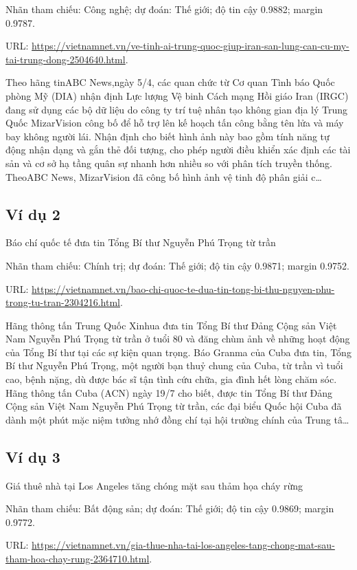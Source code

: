 \noindent Nhãn tham chiếu: Công nghệ; dự đoán: Thế giới; độ tin cậy 0.9882; margin 0.9787.

\noindent URL: \url{https://vietnamnet.vn/ve-tinh-ai-trung-quoc-giup-iran-san-lung-can-cu-my-tai-trung-dong-2504640.html}.

Theo hãng tinABC News,ngày 5/4, các quan chức từ Cơ quan Tình báo Quốc phòng Mỹ (DIA) nhận định Lực lượng Vệ binh Cách mạng Hồi giáo Iran (IRGC) đang sử dụng các bộ dữ liệu do công ty trí tuệ nhân tạo không gian địa lý Trung Quốc MizarVision công bố để hỗ trợ lên kế hoạch tấn công bằng tên lửa và máy bay không người lái. Nhận định cho biết hình ảnh này bao gồm tính năng tự động nhận dạng và gắn thẻ đối tượng, cho phép người điều khiển xác định các tài sản và cơ sở hạ tầng quân sự nhanh hơn nhiều so với phân tích truyền thống. TheoABC News, MizarVision đã công bố hình ảnh vệ tinh độ phân giải c\ldots

\subsection{Ví dụ 2}
Báo chí quốc tế đưa tin Tổng Bí thư Nguyễn Phú Trọng từ trần

\noindent Nhãn tham chiếu: Chính trị; dự đoán: Thế giới; độ tin cậy 0.9871; margin 0.9752.

\noindent URL: \url{https://vietnamnet.vn/bao-chi-quoc-te-dua-tin-tong-bi-thu-nguyen-phu-trong-tu-tran-2304216.html}.

Hãng thông tấn Trung Quốc Xinhua đưa tin Tổng Bí thư Đảng Cộng sản Việt Nam Nguyễn Phú Trọng từ trần ở tuổi 80 và đăng chùm ảnh về những hoạt động của Tổng Bí thư tại các sự kiện quan trọng. Báo Granma của Cuba đưa tin, Tổng Bí thư Nguyễn Phú Trọng, một người bạn thuỷ chung của Cuba, từ trần vì tuổi cao, bệnh nặng, dù được bác sĩ tận tình cứu chữa, gia đình hết lòng chăm sóc. Hãng thông tấn Cuba (ACN) ngày 19/7 cho biết, được tin Tổng Bí thư Đảng Cộng sản Việt Nam Nguyễn Phú Trọng từ trần, các đại biểu Quốc hội Cuba đã dành một phút mặc niệm tưởng nhớ đồng chí tại hội trường chính của Trung tâ\ldots

\subsection{Ví dụ 3}
Giá thuê nhà tại Los Angeles tăng chóng mặt sau thảm họa cháy rừng

\noindent Nhãn tham chiếu: Bất động sản; dự đoán: Thế giới; độ tin cậy 0.9869; margin 0.9772.

\noindent URL: \url{https://vietnamnet.vn/gia-thue-nha-tai-los-angeles-tang-chong-mat-sau-tham-hoa-chay-rung-2364710.html}.

